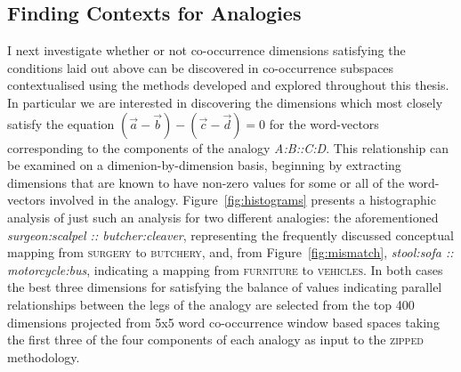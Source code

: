 \subsection{Finding Contexts for Analogies}
I next investigate whether or not co-occurrence dimensions satisfying the conditions laid out above can be discovered in co-occurrence subspaces contextualised using the methods developed and explored throughout this thesis.  In particular we are interested in discovering the dimensions which most closely satisfy the equation $(\overrightarrow{a} - \overrightarrow{b}) - (\overrightarrow{c} - \overrightarrow{d}) = 0$ for the word-vectors corresponding to the components of the analogy \emph{A:B::C:D}.  This relationship can be examined on a dimenion-by-dimension basis, beginning by extracting dimensions that are known to have non-zero values for some or all of the word-vectors involved in the analogy.  Figure~\ref{fig:histograms} presents a histographic analysis of just such an analysis for two different analogies: the aforementioned \emph{surgeon:scalpel :: butcher:cleaver}, representing the frequently discussed conceptual mapping from \textsc{surgery} to \textsc{butchery}, and, from Figure~\ref{fig:mismatch}, \emph{stool:sofa :: motorcycle:bus}, indicating a mapping from \textsc{furniture} to \textsc{vehicles}.  In both cases the best three dimensions for satisfying the balance of values indicating parallel relationships between the legs of the analogy are selected from the top 400 dimensions projected from 5x5 word co-occurrence window based spaces taking the first three of the four components of each analogy as input to the \textsc{zipped} methodology.


